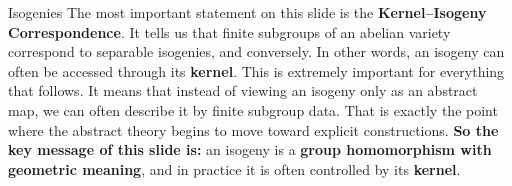 \documentclass[aspectratio=169,notheorems]{beamer}
\begin{document}
\begin{frame}{Isogenies}
{			The most important statement on this slide is the \textbf{Kernel--Isogeny Correspondence}. It tells us that finite subgroups of an abelian variety correspond to separable isogenies, and conversely. In other words, an isogeny can often be accessed through its \textbf{kernel}.
			This is extremely important for everything that follows. It means that instead of viewing an isogeny only as an abstract map, we can often describe it by finite subgroup data. That is exactly the point where the abstract theory begins to move toward explicit constructions.
			\textbf{So the key message of this slide is:} an isogeny is a \textbf{group homomorphism with geometric meaning}, and in practice it is often controlled by its \textbf{kernel}.
		}
	\end{frame}
	
	
	
\end{document}
